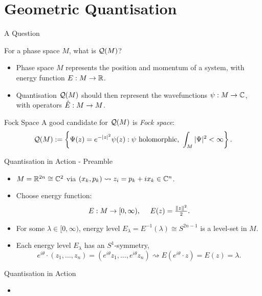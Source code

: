 \section{Geometric Quantisation}

\begin{frame}{A Question}

    For a phase space $M$, what is $\mathcal{Q}(M)$?

    \begin{itemize}
        \item Phase space $M$ represents the position and momentum of a system, with energy function $E : M \rightarrow \mathbb{R}$.
        \item Quantisation $\mathcal{Q}(M)$ should then represent the wavefunctions $\psi : M \rightarrow \mathbb{C}$, with operators $\hat{E} : M \rightarrow M$.
    \end{itemize}

    \begin{block}{Fock Space}
        A good candidate for $\mathcal{Q}(M)$ is \emph{Fock space}:
        \begin{equation*}
            \mathcal{Q}(M) := \left\{ \Psi(z) = e^{-|z|^{2}}\psi(z) : \psi \text{ holomorphic},\ \int_{M} |\Psi|^{2} < \infty \right\}.
        \end{equation*}
    \end{block}

\end{frame}

\begin{frame}{Quantisation in Action - Preamble}

    \begin{itemize}
        \item $M = \mathbb{R}^{2n} \cong \mathbb{C}^{2}$ via $(x_{k}, p_{k}) \rightsquigarrow z_{i} = p_{k} + ix_{k} \in \mathbb{C}^{n}$.
        \item Choose energy function: 
        $$ E : M \rightarrow [0,\infty), \quad\ E(z) = \tfrac{\|z\|^{2}}{2}. $$
        \item For some $\lambda \in [0,\infty)$, energy level $E_{\lambda} = E^{-1}(\lambda) \cong S^{2n-1}$ is a level-set in $M$.
        \item Each energy level $E_{\lambda}$ has an $S^{1}$-symmetry,
        $$ e^{i\theta}\cdot (z_{1}, \ldots, z_{n}) = (e^{i\theta}z_{1}, \ldots, e^{i\theta}z_{n}) \rightsquigarrow E(e^{i\theta}\cdot z) = E(z) = \lambda. $$
    \end{itemize}

\end{frame}

\begin{frame}{Quantisation in Action}

    \begin{itemize}
        \item 
    \end{itemize}

\end{frame}